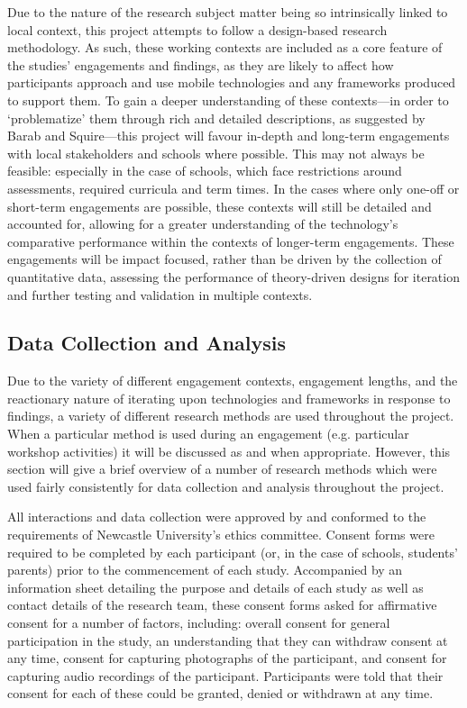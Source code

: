 Due to the nature of the research subject matter being so intrinsically linked to local context, this project attempts to follow a design-based research methodology. As such, these working contexts are included as a core feature of the studies' engagements and findings, as they are likely to affect how participants approach and use mobile technologies and any frameworks produced to support them. To gain a deeper understanding of these contexts---in order to `problematize' them through rich and detailed descriptions, as suggested by Barab and Squire---this project will favour in-depth and long-term engagements with local stakeholders and schools where possible. This may not always be feasible: especially in the case of schools, which face restrictions around assessments, required curricula and term times. In the cases where only one-off or short-term engagements are possible, these contexts will still be detailed and accounted for, allowing for a greater understanding of the technology's comparative performance within the contexts of longer-term engagements. These engagements will be impact focused, rather than be driven by the collection of quantitative data, assessing the performance of theory-driven designs for iteration and further testing and validation in multiple contexts.

\subsection{Data Collection and Analysis}

Due to the variety of different engagement contexts, engagement lengths, and the reactionary nature of iterating upon technologies and frameworks in response to findings, a variety of different research methods are used throughout the project. When a particular method is used during an engagement (e.g. particular workshop activities) it will be discussed as and when appropriate. However, this section will give a brief overview of a number of research methods which were used fairly consistently for data collection and analysis throughout the project.

All interactions and data collection were approved by and conformed to the requirements of Newcastle University’s ethics committee. Consent forms were required to be completed by each participant (or, in the case of schools, students' parents) prior to the commencement of each study. Accompanied by an information sheet detailing the purpose and details of each study as well as contact details of the research team, these consent forms asked for affirmative consent for a number of factors, including: overall consent for general participation in the study, an understanding that they can withdraw consent at any time, consent for capturing photographs of the participant, and consent for capturing audio recordings of the participant. Participants were told that their consent for each of these could be granted, denied or withdrawn at any time.

